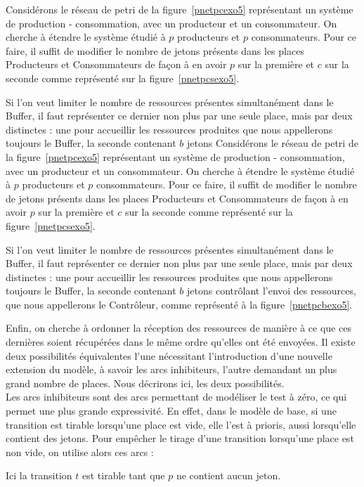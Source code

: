    
Considérons le réseau de petri de la figure~\ref{pnetpcexo5} représentant un système de production -
consommation, avec un producteur et un consommateur. On cherche à étendre le système étudié à $p$
producteurs et $p$ consommateurs. Pour ce faire, il suffit de modifier le nombre de jetons présents
dans les places Producteurs et Consommateurs de façon à en avoir $p$ sur la première et $c$ sur la
seconde comme représenté sur la figure~\ref{pnetpcsexo5}.

Si l'on veut limiter le nombre de ressources présentes simultanément dans le Buffer, il faut
représenter ce dernier non plus par une seule place, mais par deux distinctes : une pour accueillir
les ressources produites que nous appellerons toujours le Buffer, la seconde contenant $b$ jetons
Considérons le réseau de petri de la figure~\ref{pnetpcexo5} représentant un système de production -
consommation, avec un producteur et un consommateur. On cherche à étendre le système étudié à $p$
producteurs et $p$ consommateurs. Pour ce faire, il suffit de modifier le nombre de jetons présents
dans les places Producteurs et Consommateurs de façon à en avoir $p$ sur la première et $c$ sur la
seconde comme représenté sur la figure~\ref{pnetpcsexo5}.

Si l'on veut limiter le nombre de ressources présentes simultanément dans le Buffer, il faut
représenter ce dernier non plus par une seule place, mais par deux distinctes : une pour accueillir
les ressources produites que nous appellerons toujours le Buffer, la seconde contenant $b$ jetons
contrôlant l'envoi des ressources, que nous appellerons le Contrôleur, comme représenté
à la figure~\ref{pnetpcbexo5}.

Enfin, on cherche à ordonner la réception des ressources de manière à ce que ces dernières soient
récupérées dans le même ordre qu'elles ont été envoyées. Il existe deux possibilités équivalentes
l'une nécessitant l'introduction d'une nouvelle extension du modèle, à savoir les arcs inhibiteurs,
l'autre demandant un plus grand nombre de places. Nous décrirons ici, les deux possibilités.\\
Les arcs inhibiteurs sont des arcs permettant de modéliser le test à zéro, ce qui permet une plus
grande expressivité. En effet, dans le modèle de base, si une transition est tirable lorsqu'une
place est vide, elle l'est à prioris, aussi lorsqu'elle contient des jetons. Pour empêcher le tirage
d'une transition lorsqu'une place est non vide, on utilise alors ces arcs : 
\begin{center}
\end{center}
Ici la transition $t$ est tirable tant que $p$ ne contient aucun jeton.

